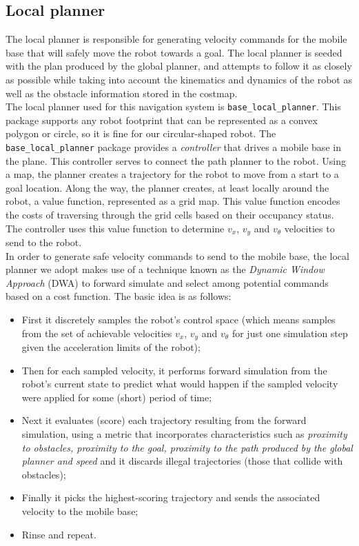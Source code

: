 \subsection*{Local planner}
The local planner is responsible for generating velocity commands for
the mobile base that will safely move the robot towards a goal. The local
planner is seeded with the plan produced by the global planner, and attempts
to follow it as closely as possible while taking into account the kinematics
and dynamics of the robot as well as the obstacle information stored in the
costmap.
\\
The local planner used for this navigation system is \texttt{base\_local\_planner}.
This package supports any robot footprint that can be represented as a convex
polygon or circle, so it is fine for our circular-shaped robot.
The \texttt{base\_local\_planner} package provides a \textit{controller} that drives
a mobile base in the plane. This controller serves to connect the path planner
to the robot. Using a map, the planner creates a trajectory for the robot to
move from a start to a goal location. Along the way, the planner creates, at
least locally around the robot, a value function, represented as a grid map.
This value function encodes the costs of traversing through the grid cells
based on their occupancy status. The controller uses this value function to determine 
$v_x$, $v_y$ and $v_\theta$ velocities to send to the robot.
\\
In order to generate safe velocity commands to send to the mobile base,
the local planner we adopt makes use of a technique known as the \textit{Dynamic
Window Approach} (DWA) to forward simulate and select among potential
commands based on a cost function. The basic idea is as follows:
\begin{itemize}
    \item First it discretely samples the robot’s control space (which means
    samples from the set of achievable velocities $v_x$, $v_y$ and $v_\theta$ for just one
    simulation step given the acceleration limits of the robot);
    \item Then for each sampled velocity, it performs forward simulation from
    the robot’s current state to predict what would happen if the sampled
    velocity were applied for some (short) period of time;
    \item Next it evaluates (score) each trajectory resulting from the forward
    simulation, using a metric that incorporates characteristics such as
    \textit{proximity to obstacles, proximity to the goal, proximity to the path produced 
    by the global planner and speed} and it discards illegal trajectories
    (those that collide with obstacles);
    \item Finally it picks the highest-scoring trajectory and sends the associated
    velocity to the mobile base;
    \item Rinse and repeat.
\end{itemize}
